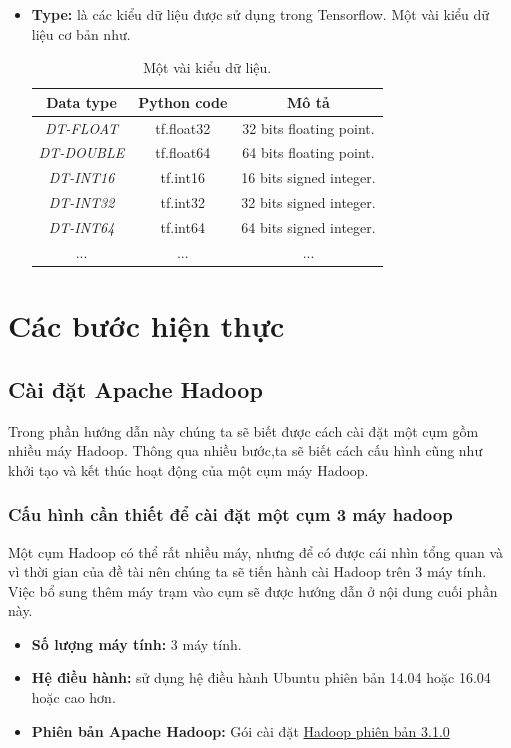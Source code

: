 \begin{itemize}
		\item \textbf{Type:} là các kiểu dữ liệu được sử dụng trong Tensorflow. Một vài kiểu dữ liệu cơ bản như.\\
		\begin{table}[h!]
			\centering
			\begin{tabular}{ | c | c | c | }
 			\hline
 			 \textbf{Data type} & \textbf{Python code} & \textbf{Mô tả}\\
 			\hline
 			\textit{DT-FLOAT}  & tf.float32  & 32 bits floating point.  \\
			\hline
			\textit{DT-DOUBLE} & tf.float64 & 64 bits floating point.\\
			\hline
			\textit{DT-INT16} & tf.int16	 & 16 bits signed integer.\\
			\hline
			\textit{DT-INT32} & tf.int32	 & 32 bits signed integer.	\\
			\hline
			\textit{DT-INT64} & tf.int64	 & 64 bits signed integer. \\
			\hline
			... & ... & ...\\
			\hline
			
		\end{tabular}
		\caption{Một vài kiểu dữ liệu.}
		\label{table:type}
		\end{table}
		\pagebreak
		
		
	\end{itemize}
	
	

\section{Các bước hiện thực}

	\subsection{Cài đặt Apache Hadoop}
	Trong phần hướng dẫn này chúng ta sẽ biết được cách cài đặt một cụm gồm nhiều máy Hadoop. Thông qua nhiều bước,ta sẽ biết cách cấu hình cũng như khởi tạo và kết thúc hoạt động của một cụm máy Hadoop.\par 
	\subsubsection{Cấu hình cần thiết để cài đặt một cụm 3 máy hadoop}
	Một cụm Hadoop có thể rất nhiều máy, nhưng để có được cái nhìn tổng quan và vì thời gian của đề tài nên chúng ta sẽ tiến hành cài Hadoop trên 3 máy tính. Việc bổ sung thêm máy trạm vào cụm sẽ được hướng dẫn ở nội dung cuối phần này.\par 
	\begin{itemize}
		\item \textbf{Số lượng máy tính: } 3 máy tính.
		\item \textbf{Hệ điều hành: } sử dụng hệ điều hành Ubuntu phiên bản 14.04 hoặc 16.04 hoặc cao hơn.
		\item \textbf{Phiên bản Apache Hadoop: }Gói cài đặt \href{http://hadoop.apache.org/releases.html}{Hadoop phiên bản 3.1.0}
	\end{itemize}
